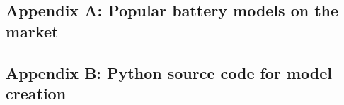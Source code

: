 \subsection{Appendix A: Popular battery models on the market}

\subsection{Appendix B: Python source code for model creation}
